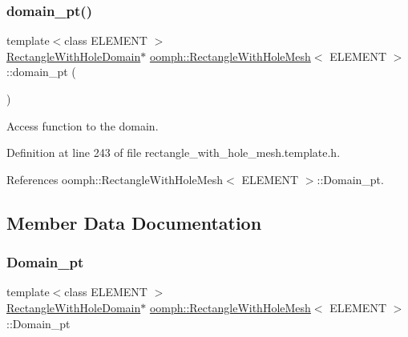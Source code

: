 \subsubsection{\texorpdfstring{domain\+\_\+pt()}{domain\_pt()}}
{\footnotesize\ttfamily template$<$class E\+L\+E\+M\+E\+NT $>$ \\
\hyperlink{classoomph_1_1RectangleWithHoleDomain}{Rectangle\+With\+Hole\+Domain}$\ast$ \hyperlink{classoomph_1_1RectangleWithHoleMesh}{oomph\+::\+Rectangle\+With\+Hole\+Mesh}$<$ E\+L\+E\+M\+E\+NT $>$\+::domain\+\_\+pt (\begin{DoxyParamCaption}{ }\end{DoxyParamCaption})\hspace{0.3cm}{\ttfamily [inline]}}



Access function to the domain. 



Definition at line 243 of file rectangle\+\_\+with\+\_\+hole\+\_\+mesh.\+template.\+h.



References oomph\+::\+Rectangle\+With\+Hole\+Mesh$<$ E\+L\+E\+M\+E\+N\+T $>$\+::\+Domain\+\_\+pt.



\subsection{Member Data Documentation}
\mbox{\label{classoomph_1_1RectangleWithHoleMesh_a04b200644403da650d38e707285e2b53}} 
\subsubsection{\texorpdfstring{Domain\+\_\+pt}{Domain\_pt}}
{\footnotesize\ttfamily template$<$class E\+L\+E\+M\+E\+NT $>$ \\
\hyperlink{classoomph_1_1RectangleWithHoleDomain}{Rectangle\+With\+Hole\+Domain}$\ast$ \hyperlink{classoomph_1_1RectangleWithHoleMesh}{oomph\+::\+Rectangle\+With\+Hole\+Mesh}$<$ E\+L\+E\+M\+E\+NT $>$\+::Domain\+\_\+pt\hspace{0.3cm}{\ttfamily [protected]}}



